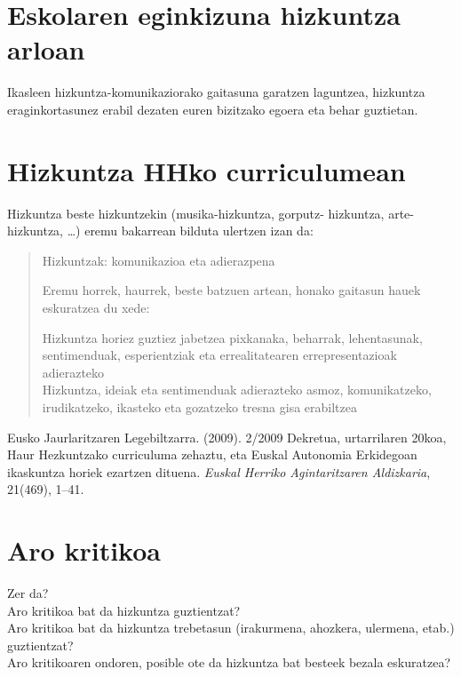 \documentclass[
]{book}
\begin{document}
\hypertarget{eskolaren-eginkizuna-hizkuntza-arloan}{%
\section{Eskolaren eginkizuna hizkuntza arloan}\label{eskolaren-eginkizuna-hizkuntza-arloan}}

Ikasleen hizkuntza-komunikaziorako gaitasuna garatzen laguntzea, hizkuntza eraginkortasunez erabil dezaten euren bizitzako egoera eta behar guztietan.

\hypertarget{hizkuntza-hhko-curriculumean}{%
\section{Hizkuntza HHko curriculumean}\label{hizkuntza-hhko-curriculumean}}

Hizkuntza beste hizkuntzekin (musika-hizkuntza, gorputz- hizkuntza, arte-hizkuntza, \ldots) eremu bakarrean bilduta ulertzen izan da:

\begin{quote}
Hizkuntzak: komunikazioa eta adierazpena

Eremu horrek, haurrek, beste batzuen artean, honako gaitasun hauek eskuratzea du xede:

Hizkuntza horiez guztiez jabetzea pixkanaka, beharrak, lehentasunak, sentimenduak, esperientziak eta errealitatearen errepresentazioak adierazteko\\
Hizkuntza, ideiak eta sentimenduak adierazteko asmoz, komunikatzeko, irudikatzeko, ikasteko eta gozatzeko tresna gisa erabiltzea
\end{quote}

Eusko Jaurlaritzaren Legebiltzarra. (2009). 2/2009 Dekretua, urtarrilaren 20koa, Haur Hezkuntzako curriculuma zehaztu, eta Euskal Autonomia Erkidegoan ikaskuntza horiek ezartzen dituena. \emph{Euskal Herriko Agintaritzaren Aldizkaria}, 21(469), 1--41.

\hypertarget{aro-kritikoa}{%
\section{Aro kritikoa}\label{aro-kritikoa}}

Zer da?\\
Aro kritikoa bat da hizkuntza guztientzat?\\
Aro kritikoa bat da hizkuntza trebetasun (irakurmena, ahozkera, ulermena, etab.) guztientzat?\\
Aro kritikoaren ondoren, posible ote da hizkuntza bat besteek bezala eskuratzea?
\end{document}
